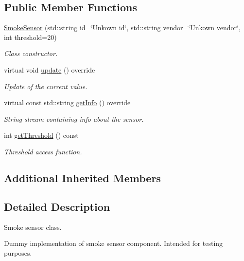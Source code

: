 \subsection*{Public Member Functions}
\begin{DoxyCompactItemize}
\item 
\hyperlink{classSmokeSensor_ad1868d458952ec5b3c8a7c5883232582}{Smoke\+Sensor} (std\+::string id=\char`\"{}Unkown id\char`\"{}, std\+::string vendor=\char`\"{}Unkown vendor\char`\"{}, int threshold=20)
\begin{DoxyCompactList}\small\item\em Class constructor. \end{DoxyCompactList}\item 
virtual void \hyperlink{classSmokeSensor_a31bc900b0d1c5c893f8555fdcbe4266b}{update} () override
\begin{DoxyCompactList}\small\item\em Update of the current value. \end{DoxyCompactList}\item 
virtual const std\+::string \hyperlink{classSmokeSensor_ae7151069c8a66de157f9d66da631412c}{get\+Info} () override\hypertarget{classSmokeSensor_ae7151069c8a66de157f9d66da631412c}{}\label{classSmokeSensor_ae7151069c8a66de157f9d66da631412c}

\begin{DoxyCompactList}\small\item\em String stream containing info about the sensor. \end{DoxyCompactList}\item 
int \hyperlink{classSmokeSensor_add325306c6a33436bc9053721cbdb88b}{get\+Threshold} () const 
\begin{DoxyCompactList}\small\item\em Threshold access function. \end{DoxyCompactList}\end{DoxyCompactItemize}
\subsection*{Additional Inherited Members}


\subsection{Detailed Description}
Smoke sensor class. 

Dummy implementation of smoke sensor component. Intended for testing purposes. 


